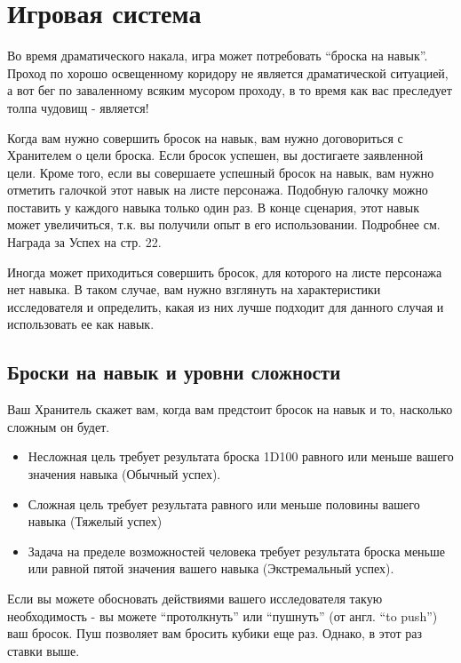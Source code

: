 \documentclass[letterpaper,twocolumn,openany, twoside, 11pt, usenames]{cocbook}
\begin{document}
\section*{Игровая система}

Во время драматического накала, игра может потребовать ``броска на навык''. Проход по хорошо освещенному коридору не является драматической ситуацией, а вот бег по заваленному всяким мусором проходу, в то время как вас преследует толпа чудовищ - является!

Когда вам нужно совершить бросок на навык, вам нужно договориться с Хранителем о цели броска. Если бросок успешен, вы достигаете заявленной цели. Кроме того, если вы совершаете успешный бросок на навык, вам нужно отметить галочкой этот навык на листе персонажа. Подобную галочку можно поставить у каждого навыка только один раз. В конце сценария, этот навык может увеличиться, т.к. вы получили опыт в его использовании. Подробнее см. Награда за Успех на стр. 22.

Иногда может приходиться совершить бросок, для которого на листе персонажа нет навыка. В таком случае, вам нужно взглянуть на характеристики исследователя и определить, какая из них лучше подходит для данного случая и использовать ее как навык.

\subsection*{Броски на навык и уровни сложности}

Ваш Хранитель скажет вам, когда вам предстоит бросок на навык и то, насколько сложным он будет.
\smallbreak
\begin{itemize}[leftmargin=4mm]
  \item Несложная цель требует результата броска 1D100 равного или меньше вашего значения навыка (Обычный успех).
  \item Сложная цель требует результата равного или меньше половины вашего навыка (Тяжелый успех)
  \item Задача на пределе возможностей человека требует результата броска меньше или равной пятой значения вашего навыка (Экстремальный успех).
\end{itemize}
\smallbreak
Если вы можете обосновать действиями вашего исследователя такую необходимость - вы можете ``протолкнуть'' или ``пушнуть'' (от англ. ``to push'') ваш бросок. Пуш позволяет вам бросить кубики еще раз. Однако, в этот раз ставки выше.
\end{document}
